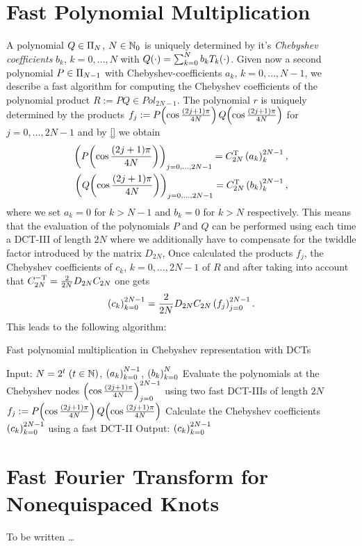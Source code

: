 \section{Fast Polynomial Multiplication}
\label{Basics:FastPolynomialMultiplication}
A polynomial $Q \in \Pi_{N}$, $N \in \mathbb{N}_{0}$ is uniquely determined by it's \emph{Chebyshev coefficients} 
$b_{k}$, $k = 0,\ldots,N$ with
$Q{\hspace{-0.4ex}}\left(\cdot\right) = \sum_{k=0}^N b_{k} T_{k}{\hspace{-0.4ex}}\left(\cdot\right)$. Given now a second polynomial $P \in \Pi_{N-1}$ with 
Chebyshev-coefficients $a_{k}$, $k = 0,\ldots,N-1$, we describe a fast algorithm for computing the 
Chebyshev coefficients of the polynomial product $R := P Q \in Pol_{2N-1}$. The polynomial $r$ is uniquely determined 
by the products $f_{j} := P{\hspace{-0.4ex}}\left(\cos \frac{(2j+1)\pi}{4N}\right) Q{\hspace{-0.4ex}}\left(\cos \frac{(2j+1)\pi}{4N}\right)$ for $j = 0,\ldots,2N-1$ and 
by \eqref{} we obtain
\begin{eqnarray*}
  \left(P{\hspace{-0.4ex}}\left(\cos \frac{(2j+1)\pi}{4N}\right)\right)_{j=0,\ldots,2N-1} = C_{2N}^{\text{\rm{T}}} \left(a_{k}\right)_{k}^{2N-1},\\
  \left(Q{\hspace{-0.4ex}}\left(\cos \frac{(2j+1)\pi}{4N}\right)\right)_{j=0,\ldots,2N-1} = C_{2N}^{\text{\rm{T}}} \left(b_{k}\right)_{k}^{2N-1},
\end{eqnarray*}
where we set $a_{k} = 0$ for $k > N-1$ and $b_{k} = 0$ for $k > N$ respectively. This means that the evaluation 
of the polynomials $P$ and $Q$ can be performed using each time a DCT-III of length $2N$ where we additionally have to 
compensate for the twiddle factor introduced by the matrix $D_{2N}$,
Once calculated the products $f_{j}$, the Chebyshev coefficients of $c_{k}$, $k = 0,\ldots,2N-1$ of $R$ and after
taking into account that $C_{2N}^{-\text{\rm{T}}} = \frac{2}{2N} D_{2N} C_{2N}$ one gets
$$ \left(c_{k}\right)_{k=0}^{2N-1} = \frac{2}{2N} D_{2N} C_{2N} \left(f_{j}\right)_{j = 0}^{2N-1}.$$
This leads to the following algorithm:

\begin{algorithm}[ht]
  \caption{Fast polynomial multiplication in Chebyshev representation with DCTs}
  \label{Basics:Algorithm:FastPolynomialMultiplication}    
  \begin{algorithmic}
    \STATE  Input:  $N = 2^t\; (t \in \mathbb{N})$, $\left(a_{k}\right)_{k = 0}^{N-1}$, $\left(b_{k}\right)_{k = 0}^{N}$
    \STATE
    \STATE Evaluate the polynomials at the Chebyshev nodes $\left(\cos \frac{(2j+1)\pi}{4N}\right)_{j = 0}^{2N-1}$
      using two fast DCT-IIIs of length $2N$
    \STATE 
      \STATE $f_{j} := P{\hspace{-0.4ex}}\left(\cos \frac{(2j+1)\pi}{4N}\right) Q{\hspace{-0.4ex}}\left(\cos \frac{(2j+1)\pi}{4N}\right)$
    \ENDFOR
    \STATE
    \STATE Calculate the Chebyshev coefficients $\left(c_{k}\right)_{k=0}^{2N-1}$ using a fast DCT-II 
    \STATE
    \STATE Output: $\left(c_{k}\right)_{k=0}^{2N-1}$
\end{algorithmic}
\end{algorithm}

\section{Fast Fourier Transform for Nonequispaced Knots}
\label{Basics:NFFT}

To be written \dots